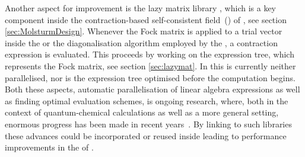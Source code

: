 Another aspect for improvement
is the lazy matrix library \lazyten,
which is a key component inside the contraction-based
self-consistent field~(\SCF) of \molsturm,
see section \vref{sec:MolsturmDesign}.
Whenever the Fock matrix is applied to a trial vector
inside the \SCF or the diagonalisation algorithm
employed by the \SCF,
a contraction expression is evaluated.
This proceeds by working on the expression tree,
which represents the Fock matrix,
see section \vref{sec:lazymat}.
In \lazyten this is currently neither parallelised,
nor is the expression tree optimised before the computation begins.
Both these aspects,
\ie automatic parallelisation of linear algebra expressions
as well as finding optimal evaluation schemes,
is ongoing research,
where, both in the context of quantum-chemical calculations
as well as a more general setting,
enormous progress has been made in recent years~\cite{Baumgartner2005,Solomonik2014,%
Peise2015,Calvin2015,Calvin2015arxiv,Xerus,Kristensen2016array,%
Kristensen2016streaming,Libtensor}.
By linking to such libraries
these advances could be incorporated or reused
inside \lazyten leading to performance improvements in the \SCF of \molsturm.




